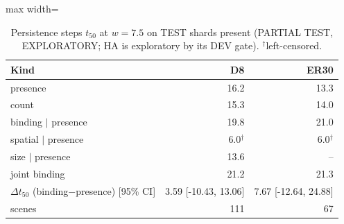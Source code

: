 \begin{table}[t]\centering\small
\caption{Persistence steps $t_{50}$ at $w=7.5$ on TEST shards present (PARTIAL TEST, EXPLORATORY; HA is exploratory by its DEV gate). $^\dagger$left-censored.}\label{tab:partial-ha}
\begin{adjustbox}{max width=\linewidth}
\begin{tabular}{lrr}
\toprule
Kind & D8 & ER30 \\
\midrule
presence & 16.2 & 13.3 \\
count & 15.3 & 14.0 \\
binding $\mid$ presence & 19.8 & 21.0 \\
spatial $\mid$ presence & 6.0$^\dagger$ & 6.0$^\dagger$ \\
size $\mid$ presence & 13.6 & -- \\
joint binding & 21.2 & 21.3 \\
$\Delta t_{50}$ (binding$-$presence) [95\% CI] & 3.59 [-10.43, 13.06] & 7.67 [-12.64, 24.88] \\
scenes & 111 & 67 \\
\bottomrule
\end{tabular}
\end{adjustbox}
\end{table}
